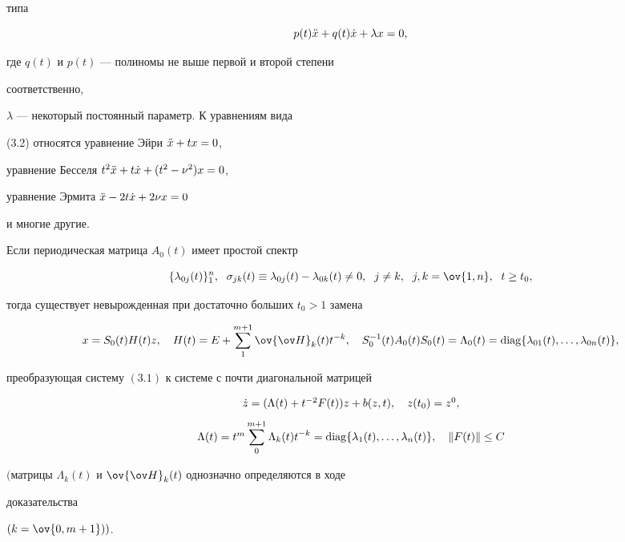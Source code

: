 типа 


\begin{equation} 


p(t)\Ddot x+q(t)\Dot x+\lambda x=0, 


\end{equation} 


где $q(t)$ и $p(t)$ --- полиномы не выше первой и второй степени 


соответственно, 


$\lambda$ --- некоторый постоянный параметр. К уравнениям вида  


(3.2) относятся уравнение Эйри $\Ddot x+t x=0$, 


уравнение Бесселя $t^2\Ddot x+t\Dot x+(t^2-\nu^2)x=0$, 


уравнение Эрмита $\Ddot x-2t\Dot x+2\nu x=0$ 


и многие другие.  


 


\begin{thms} 


Если периодическая матрица $A_0(t)$ имеет простой спектр 


$$ 


\{\lambda_{0j}(t)\}^n_1,\ \; \sigma_{j k}(t)\equiv 


\lambda_{0j}(t)-\lambda_{0k}(t)\ne0, 


\ \; j\ne k,\ \; j,k=\ov{1,n},\ \; t\ge t_0, 


$$ 


тогда существует невырожденная при достаточно больших $t_0>1$ замена 


$$


x=S_0(t)H(t)z,\quad H(t)=E+\sum^{m+1}_1\ov{\ov H}_k(t)t^{-k},\quad 


S^{-1}_0(t)A_0(t)S_0(t)=\Lambda_0(t)= 


\diag\{\lambda_{01}(t),\dotsc,\lambda_{0n}(t)\}, 


$$ 


преобразующая систему $(3.1)$ к системе с почти диагональной матрицей 


\begin{equation} 


\begin{array}{c} 


\Dot z=(\Lambda(t)+t^{-2}F(t))z+b(z,t),\quad z(t_0)=z^0,\\[3mm] 


\Lambda(t)=t^m\displaystyle\sum^{m+1}_0\Lambda_k(t)t^{-k}= 


\diag\{\lambda_1(t),\dotsc,\lambda_n(t)\},\quad 


\|F(t)\|\le C 


\end{array} 


\end{equation} 


$($матрицы $\Lambda_k(t)$ и $\ov{\ov H}_k(t)$ однозначно определяются в ходе 


доказательства 


$(k=\ov{0,m+1}))$. 


\end{thms} 


